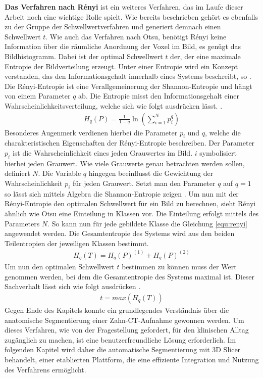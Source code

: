 \textbf{Das Verfahren nach Rényi} ist ein weiteres Verfahren, das im Laufe
dieser Arbeit noch eine wichtige Rolle spielt. Wie bereits beschrieben gehört es
ebenfalls zu der Gruppe der Schwellwertverfahren und generiert demnach einen Schwellwert
$t$. Wie auch das Verfahren nach Otsu, benötigt Rényi keine Information über die
räumliche Anordnung der Voxel im Bild, es genügt das Bildhistogramm. Dabei ist der
optimal Schwellwert $t$ der, der eine maximale Entropie der Bildverteilung
erzeugt. Unter einer Entropie wird ein Konzept verstanden, das den
Informationsgehalt innerhalb eines Systems beschreibt, so \citet[S.~102]{bein2006}.
Die Rényi-Entropie ist eine Verallgemeinerung der Shannon-Entropie und hängt von
einem Parameter $q$ ab. Die Entropie misst den Informationsgehalt einer
Wahrscheinlichkeitsverteilung, welche sich wie folgt ausdrücken lässt. \citep[vgl.][K.~2]{bromiley2004}.
\begin{align}
	\label{equ:renyi}H_{q}(P) = \frac{1}{1-q}\ln \left( \sum_{i=1}^{N}p_{i}^{q}\right)
\end{align}
Besonderes Augenmerk verdienen hierbei die Parameter $p_{i}$ und $q$, welche die
charakteristischen Eigenschaften der Rényi-Entropie beschreiben. Der Parameter
$p_{i}$ ist die Wahrscheinlichkeit eines jeden Grauwertes im Bild. $i$ symbolisiert
hierbei jeden Grauwert. Wie viele Grauwerte genau betrachten werden sollen, definiert
$N$. Die Variable $q$ hingegen beeinflusst die Gewichtung der Wahrscheinlichkeit
$p_{i}$ für jeden Grauwert. Setzt man den Parameter $q$ auf $q = 1$ so lässt sich
mittels Algebra die Shannon-Entropie zeigen \citep[vgl.][K.~2]{bromiley2004}. Um
nun mit der Rényi-Entropie den optimalen Schwellwert für ein Bild zu berechnen,
sieht Rényi ähnlich wie Otsu eine Einteilung in Klassen vor. Die Einteilung erfolgt
mittels des Parameters $N$. So kann nun für jede gebildete Klasse die Gleichung
\ref{equ:renyi} angewendet werden. Die Gesamtentropie des Systems wird aus den beiden
Teilentropien der jeweiligen Klassen bestimmt\citep[vgl.][K.~2]{bromiley2004}.
\begin{align}
	H_{q}(T) = H_{q}(P)^{(1)}+ H_{q}(P)^{(2)}
\end{align}
Um nun den optimalen Schwellwert $t$ bestimmen zu können muss der Wert genommen
werden, bei dem die Gesamtentropie des Systems maximal ist. Dieser Sachverhalt
lässt sich wie folgt ausdrücken \citep[vgl.][K.~2]{bromiley2004}.
\begin{align}
	t = max(H_{q}(T))
\end{align}
Gegen Ende des Kapitels konnte ein grundlegendes Verständnis über die
anatomische Segmentierung einer Zahn-\ac{CT}-Aufnahme gewonnen werden. Um dieses
Verfahren, wie von der Fragestellung gefordert, für den klinischen Alltag
zugänglich zu machen, ist eine benutzerfreundliche Lösung erforderlich. Im
folgenden Kapitel wird daher die automatische Segmentierung mit 3D Slicer
behandelt, einer etablierten Plattform, die eine effiziente Integration und
Nutzung des Verfahrens ermöglicht.
